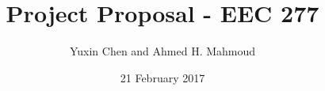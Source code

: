 \documentclass[12pt] {article}
\begin{document}
\title{Project Proposal - EEC 277}
\author{Yuxin Chen and Ahmed H. Mahmoud}
\date{21 February 2017} 
\maketitle














\end{document}
